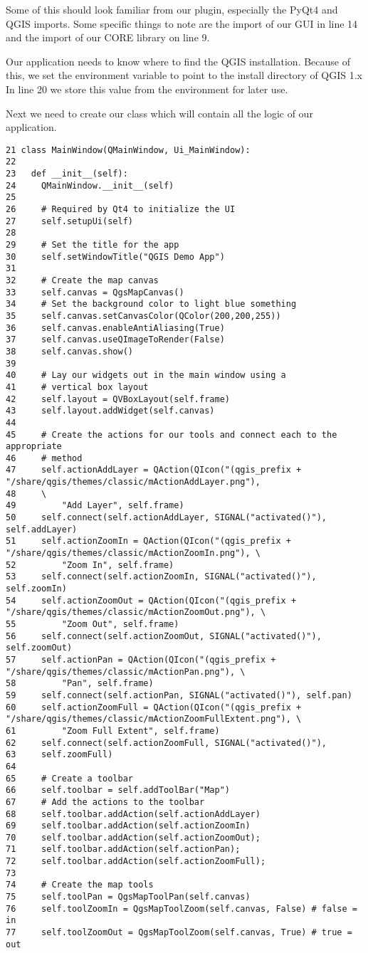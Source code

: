 Some of this should look familiar from our plugin, especially the PyQt4 and
QGIS imports. Some specific things to note are the import of our GUI in line
14 and the import of our CORE library on line 9.

Our application needs to know where to find the QGIS installation. Because
of this, we set the  environment variable to point to the 
install directory of QGIS 1.x In line 20 we store this value from
the environment for later use.

Next we need to create our  class which will contain
all the logic of our application.
\begin{verbatim}
21 class MainWindow(QMainWindow, Ui_MainWindow):
22 
23   def __init__(self):
24     QMainWindow.__init__(self)
25 
26     # Required by Qt4 to initialize the UI
27     self.setupUi(self)
28 
29     # Set the title for the app
30     self.setWindowTitle("QGIS Demo App")
31 
32     # Create the map canvas
33     self.canvas = QgsMapCanvas()
34     # Set the background color to light blue something
35     self.canvas.setCanvasColor(QColor(200,200,255))
36     self.canvas.enableAntiAliasing(True)
37     self.canvas.useQImageToRender(False)
38     self.canvas.show()
39 
40     # Lay our widgets out in the main window using a 
41     # vertical box layout
42     self.layout = QVBoxLayout(self.frame)
43     self.layout.addWidget(self.canvas)
44 
45     # Create the actions for our tools and connect each to the appropriate
46     # method
47     self.actionAddLayer = QAction(QIcon("(qgis_prefix + "/share/qgis/themes/classic/mActionAddLayer.png"),
48     \
49         "Add Layer", self.frame)
50     self.connect(self.actionAddLayer, SIGNAL("activated()"), self.addLayer)
51     self.actionZoomIn = QAction(QIcon("(qgis_prefix + "/share/qgis/themes/classic/mActionZoomIn.png"), \
52         "Zoom In", self.frame)
53     self.connect(self.actionZoomIn, SIGNAL("activated()"), self.zoomIn)
54     self.actionZoomOut = QAction(QIcon("(qgis_prefix + "/share/qgis/themes/classic/mActionZoomOut.png"), \
55         "Zoom Out", self.frame)
56     self.connect(self.actionZoomOut, SIGNAL("activated()"), self.zoomOut)
57     self.actionPan = QAction(QIcon("(qgis_prefix + "/share/qgis/themes/classic/mActionPan.png"), \
58         "Pan", self.frame)
59     self.connect(self.actionPan, SIGNAL("activated()"), self.pan)
60     self.actionZoomFull = QAction(QIcon("(qgis_prefix + "/share/qgis/themes/classic/mActionZoomFullExtent.png"), \
61         "Zoom Full Extent", self.frame)
62     self.connect(self.actionZoomFull, SIGNAL("activated()"),
63     self.zoomFull)
64 
65     # Create a toolbar
66     self.toolbar = self.addToolBar("Map")
67     # Add the actions to the toolbar
68     self.toolbar.addAction(self.actionAddLayer)
69     self.toolbar.addAction(self.actionZoomIn)
70     self.toolbar.addAction(self.actionZoomOut);
71     self.toolbar.addAction(self.actionPan);
72     self.toolbar.addAction(self.actionZoomFull);
73 
74     # Create the map tools
75     self.toolPan = QgsMapToolPan(self.canvas)
76     self.toolZoomIn = QgsMapToolZoom(self.canvas, False) # false = in
77     self.toolZoomOut = QgsMapToolZoom(self.canvas, True) # true = out
\end{verbatim}

